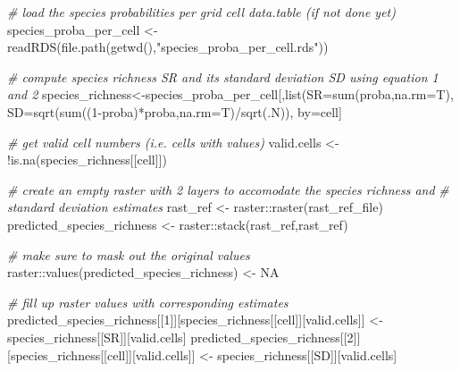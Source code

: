 \documentclass[
]{article}
\newenvironment{Shaded}{\begin{snugshade}}{\end{snugshade}}
\newcommand{\AttributeTok}[1]{\textcolor[rgb]{0.77,0.63,0.00}{#1}}
\newcommand{\CommentTok}[1]{\textcolor[rgb]{0.56,0.35,0.01}{\textit{#1}}}
\newcommand{\ConstantTok}[1]{\textcolor[rgb]{0.00,0.00,0.00}{#1}}
\newcommand{\DecValTok}[1]{\textcolor[rgb]{0.00,0.00,0.81}{#1}}
\newcommand{\FunctionTok}[1]{\textcolor[rgb]{0.00,0.00,0.00}{#1}}
\newcommand{\NormalTok}[1]{#1}
\newcommand{\OtherTok}[1]{\textcolor[rgb]{0.56,0.35,0.01}{#1}}
\newcommand{\SpecialCharTok}[1]{\textcolor[rgb]{0.00,0.00,0.00}{#1}}
\newcommand{\StringTok}[1]{\textcolor[rgb]{0.31,0.60,0.02}{#1}}
\begin{document}
\begin{Shaded}
\begin{Highlighting}[]

\CommentTok{\# load the species probabilities per grid cell data.table (if not done yet)}
\NormalTok{species\_proba\_per\_cell }\OtherTok{\textless{}{-}} \FunctionTok{readRDS}\NormalTok{(}\FunctionTok{file.path}\NormalTok{(}\FunctionTok{getwd}\NormalTok{(),}\StringTok{"species\_proba\_per\_cell.rds"}\NormalTok{))}

\CommentTok{\# compute species richness SR and its standard deviation SD using equation 1 and 2}
\NormalTok{species\_richness}\OtherTok{\textless{}{-}}\NormalTok{species\_proba\_per\_cell[,}\FunctionTok{list}\NormalTok{(}\AttributeTok{SR=}\FunctionTok{sum}\NormalTok{(proba,}\AttributeTok{na.rm=}\NormalTok{T),}
                                               \AttributeTok{SD=}\FunctionTok{sqrt}\NormalTok{(}\FunctionTok{sum}\NormalTok{((}\DecValTok{1}\SpecialCharTok{{-}}\NormalTok{proba)}\SpecialCharTok{*}\NormalTok{proba,}\AttributeTok{na.rm=}\NormalTok{T)}\SpecialCharTok{/}\FunctionTok{sqrt}\NormalTok{(.N)),}
                                               \AttributeTok{by=}\NormalTok{cell]}

\CommentTok{\# get valid cell numbers (i.e. cells with values)}
\NormalTok{valid.cells }\OtherTok{\textless{}{-}} \SpecialCharTok{!}\FunctionTok{is.na}\NormalTok{(species\_richness[[}\StringTok{\textquotesingle{}cell\textquotesingle{}}\NormalTok{]])}

\CommentTok{\# create an empty raster with 2 layers to accomodate the species richness and }
\CommentTok{\# standard deviation estimates}
\NormalTok{rast\_ref }\OtherTok{\textless{}{-}}\NormalTok{ raster}\SpecialCharTok{::}\FunctionTok{raster}\NormalTok{(rast\_ref\_file)}
\NormalTok{predicted\_species\_richness }\OtherTok{\textless{}{-}}\NormalTok{ raster}\SpecialCharTok{::}\FunctionTok{stack}\NormalTok{(rast\_ref,rast\_ref)}

\CommentTok{\# make sure to mask out the original values}
\NormalTok{raster}\SpecialCharTok{::}\FunctionTok{values}\NormalTok{(predicted\_species\_richness) }\OtherTok{\textless{}{-}} \ConstantTok{NA} 

\CommentTok{\# fill up raster values with corresponding estimates}
\NormalTok{predicted\_species\_richness[[}\DecValTok{1}\NormalTok{]][species\_richness[[}\StringTok{\textquotesingle{}cell\textquotesingle{}}\NormalTok{]][valid.cells]] }\OtherTok{\textless{}{-}} 
\NormalTok{  species\_richness[[}\StringTok{\textquotesingle{}SR\textquotesingle{}}\NormalTok{]][valid.cells]}
\NormalTok{predicted\_species\_richness[[}\DecValTok{2}\NormalTok{]][species\_richness[[}\StringTok{\textquotesingle{}cell\textquotesingle{}}\NormalTok{]][valid.cells]] }\OtherTok{\textless{}{-}} 
\NormalTok{  species\_richness[[}\StringTok{\textquotesingle{}SD\textquotesingle{}}\NormalTok{]][valid.cells]}
\end{Highlighting}
\end{Shaded}
\end{document}
